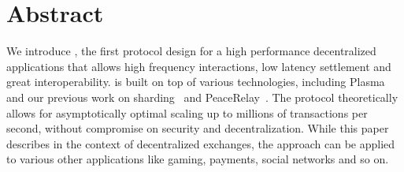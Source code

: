 \section*{Abstract}

We introduce \codename, the first protocol design for a high performance decentralized applications that allows high frequency interactions, low latency settlement and great interoperability. \codename is built on top of various technologies, including Plasma~\cite{plasma} and our previous work on sharding~\cite{elastico} and PeaceRelay~\cite{peacerelay}. The protocol theoretically allows for asymptotically optimal scaling up to millions of transactions per second, without compromise on security and decentralization. While this paper describes \codename in the context of decentralized exchanges, the approach can be applied to various other applications like gaming, payments, social networks and so on.
